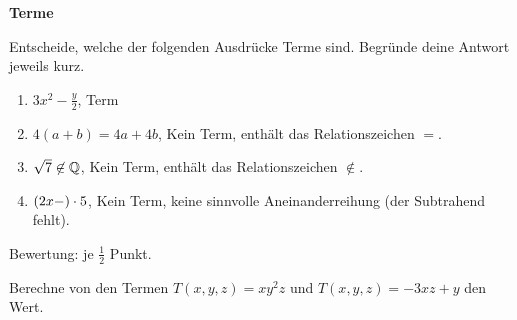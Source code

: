 \documentclass[11pt]{exam}
\newcommand{\theme}{Terme}
\begin{document}
\fontsize{14}{14}\selectfont
\begin{center}
    \huge\bf\theme
\end{center}
\begin{questions}
\question[2]
Entscheide, welche der folgenden Ausdrücke Terme sind. Begründe deine Antwort jeweils kurz.
{\begin{solution}
		\begin{enumerate}[label=(\alph*)]
			\item $3x^2-\frac{y}{2}$, Term
			\item $4(a+b)=4a+4b$, Kein Term, enthält das Relationszeichen $=$.
			\item $\sqrt{7}\not\in\mathbb{Q}$, Kein Term, enthält das Relationszeichen $\nin$.
			\item $(2x-)\cdot5$, Kein Term, keine sinnvolle Aneinanderreihung (der Subtrahend fehlt).
		\end{enumerate}
		Bewertung: je $\frac{1}{2}$ Punkt.
\end{solution}}
{
	}

\noaddpoints
\question[\totalpoints]
\addpoints
Berechne von den Termen $T(x,y,z)=xy^2z$ und $T(x,y,z)=-3xz + y$ den Wert.
\end{questions}
\end{document}
